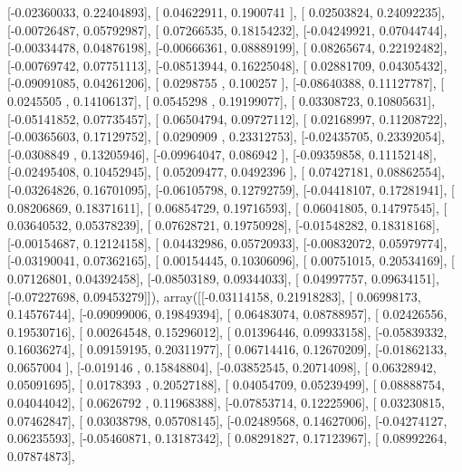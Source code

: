 \documentclass{article}
\begin{document}
       [-0.02360033,  0.22404893],
       [ 0.04622911,  0.1900741 ],
       [ 0.02503824,  0.24092235],
       [-0.00726487,  0.05792987],
       [ 0.07266535,  0.18154232],
       [-0.04249921,  0.07044744],
       [-0.00334478,  0.04876198],
       [-0.00666361,  0.08889199],
       [ 0.08265674,  0.22192482],
       [-0.00769742,  0.07751113],
       [-0.08513944,  0.16225048],
       [ 0.02881709,  0.04305432],
       [-0.09091085,  0.04261206],
       [ 0.0298755 ,  0.100257  ],
       [-0.08640388,  0.11127787],
       [ 0.0245505 ,  0.14106137],
       [ 0.0545298 ,  0.19199077],
       [ 0.03308723,  0.10805631],
       [-0.05141852,  0.07735457],
       [ 0.06504794,  0.09727112],
       [ 0.02168997,  0.11208722],
       [-0.00365603,  0.17129752],
       [ 0.0290909 ,  0.23312753],
       [-0.02435705,  0.23392054],
       [-0.0308849 ,  0.13205946],
       [-0.09964047,  0.086942  ],
       [-0.09359858,  0.11152148],
       [-0.02495408,  0.10452945],
       [ 0.05209477,  0.0492396 ],
       [ 0.07427181,  0.08862554],
       [-0.03264826,  0.16701095],
       [-0.06105798,  0.12792759],
       [-0.04418107,  0.17281941],
       [ 0.08206869,  0.18371611],
       [ 0.06854729,  0.19716593],
       [ 0.06041805,  0.14797545],
       [ 0.03640532,  0.05378239],
       [ 0.07628721,  0.19750928],
       [-0.01548282,  0.18318168],
       [-0.00154687,  0.12124158],
       [ 0.04432986,  0.05720933],
       [-0.00832072,  0.05979774],
       [-0.03190041,  0.07362165],
       [ 0.00154445,  0.10306096],
       [ 0.00751015,  0.20534169],
       [ 0.07126801,  0.04392458],
       [-0.08503189,  0.09344033],
       [ 0.04997757,  0.09634151],
       [-0.07227698,  0.09453279]]), array([[-0.03114158,  0.21918283],
       [ 0.06998173,  0.14576744],
       [-0.09099006,  0.19849394],
       [ 0.06483074,  0.08788957],
       [ 0.02426556,  0.19530716],
       [ 0.00264548,  0.15296012],
       [ 0.01396446,  0.09933158],
       [-0.05839332,  0.16036274],
       [ 0.09159195,  0.20311977],
       [ 0.06714416,  0.12670209],
       [-0.01862133,  0.0657004 ],
       [-0.019146  ,  0.15848804],
       [-0.03852545,  0.20714098],
       [ 0.06328942,  0.05091695],
       [ 0.0178393 ,  0.20527188],
       [ 0.04054709,  0.05239499],
       [ 0.08888754,  0.04044042],
       [ 0.0626792 ,  0.11968388],
       [-0.07853714,  0.12225906],
       [ 0.03230815,  0.07462847],
       [ 0.03038798,  0.05708145],
       [-0.02489568,  0.14627006],
       [-0.04274127,  0.06235593],
       [-0.05460871,  0.13187342],
       [ 0.08291827,  0.17123967],
       [ 0.08992264,  0.07874873],
\end{document}
